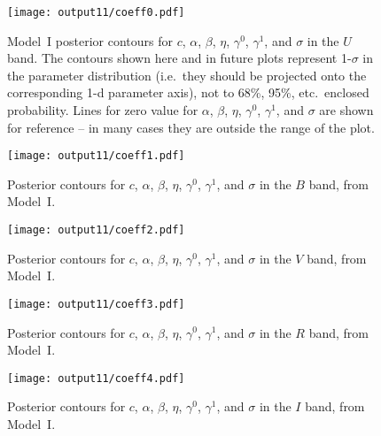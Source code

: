 \documentclass{aastex61}   	%
\begin{document}
\begin{figure}[htbp] %
   \centering
   \texttt{[image: output11/coeff0.pdf]} 
            \caption{Model~I posterior contours for $c$, $\alpha$, $\beta$, $\eta$, $\gamma^0$, $\gamma^1$, and $\sigma$ in the $U$ band.
            The contours shown here and in future plots represent 1-$\sigma$ in the parameter distribution (i.e.\ they should be
            projected onto the corresponding 1-d parameter axis), not to 68\%, 95\%, etc.\
            enclosed probability.  Lines for zero value for $\alpha$, $\beta$, $\eta$, $\gamma^0$, $\gamma^1$, and $\sigma$ are shown for reference --
            in many cases they are outside the range of the plot.
            \label{global1:fig}}
\end{figure}

\begin{figure}[htbp] %
   \centering
   \texttt{[image: output11/coeff1.pdf]} 
            \caption{Posterior contours for $c$, $\alpha$, $\beta$, $\eta$, $\gamma^0$, $\gamma^1$, and $\sigma$ in the $B$ band, from Model~I.
 \label{global2:fig}}
\end{figure}

\begin{figure}[htbp] %
   \centering
   \texttt{[image: output11/coeff2.pdf]} 
            \caption{Posterior contours for $c$, $\alpha$, $\beta$, $\eta$, $\gamma^0$, $\gamma^1$, and $\sigma$ in the $V$ band, from Model~I.
 \label{global3:fig}}
\end{figure}

\begin{figure}[htbp] %
   \centering
      \texttt{[image: output11/coeff3.pdf]} 
            \caption{Posterior contours for $c$, $\alpha$, $\beta$, $\eta$, $\gamma^0$, $\gamma^1$, and $\sigma$ in the $R$ band, from Model~I.
 \label{global4:fig}}
\end{figure}

\begin{figure}[htbp] %
   \centering
         \texttt{[image: output11/coeff4.pdf]} 
            \caption{Posterior contours for $c$, $\alpha$, $\beta$, $\eta$, $\gamma^0$, $\gamma^1$, and $\sigma$ in the $I$ band, from Model~I.
 \label{global5:fig}}
\end{figure}
\end{document}
